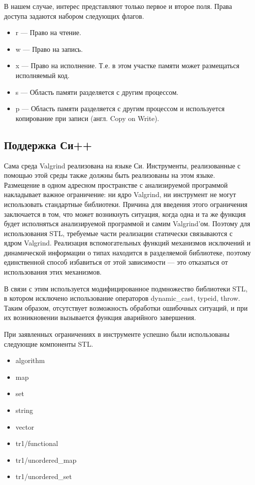 \documentclass[a4paper,12pt,russian]{article}
\newcommand{\code}[1]{\textsf{#1}}
\begin{document}
В нашем случае, интерес представляют только первое и второе поля.
Права доступа задаются набором следующих флагов.
\begin{itemize}
    \item \code{r} --- Право на чтение.
    \item \code{w} --- Право на запись.
    \item \code{x} --- Право на исполнение. Т.е. в этом участке памяти может размещаться исполняемый код.
    \item \code{s} --- Область памяти разделяется с другим процессом.
    \item \code{p} --- Область памяти разделяется с другим процессом и используется копирование при записи (англ. Copy on Write).
\end{itemize}

\subsection{Поддержка Си++}
Сама среда \code{Valgrind} реализована на языке Си. Инструменты, реализованные с помощью этой среды также должны быть реализованы на этом языке.
Размещение в одном адресном пространстве с анализируемой программой накладывает важное ограничение: ни ядро \code{Valgrind}, ни инструмент не могут использовать стандартные библиотеки.
Причина для введения этого ограничения заключается в том, что может возникнуть ситуация, когда одна и та же функция будет исполняться анализируемой программой и самим \code{Valgrind}'ом.
Поэтому для использования \code{STL}, требуемые части реализации статически связываются с ядром \code{Valgrind}.
Реализация вспомогательных функций механизмов исключений и динамической информации о типах находится в разделяемой библиотеке, поэтому единственной способ избавиться от этой зависимости --- это отказаться от использования этих механизмов.

В связи с этим используется модифицированное подмножество библиотеки \code{STL}, в котором исключено использование операторов \code{dynamic\_cast}, \code{typeid}, \code{throw}. Таким образом, отсутствует возможность обработки ошибочных ситуаций, и при их возникновении вызывается функция аварийного завершения.

При заявленных ограничениях в инструменте успешно были использованы следующие компоненты \code{STL}.
\begin{itemize}
    \item \code{algorithm}
    \item \code{map}
    \item \code{set}
    \item \code{string}
    \item \code{vector}
    \item \code{tr1/functional}
    \item \code{tr1/unordered\_map}
    \item \code{tr1/unordered\_set}
\end{itemize}
\end{document}
